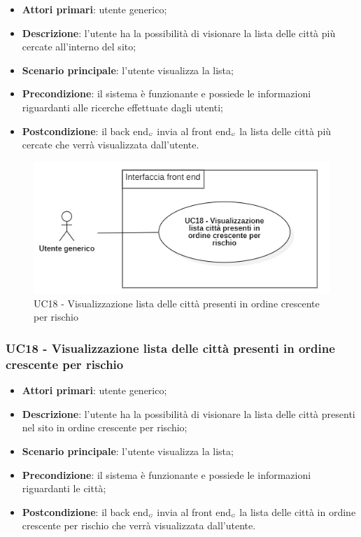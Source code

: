 \begin{itemize}
	\item \textbf{Attori primari}: utente generico;
	\item \textbf{Descrizione}: l'utente ha la possibilità di visionare la lista delle città più cercate all'interno del sito;
	\item \textbf{Scenario principale}: l'utente visualizza la lista;
	\item \textbf{Precondizione}: il sistema è funzionante e possiede le informazioni riguardanti alle ricerche effettuate dagli utenti;
	\item \textbf{Postcondizione}: il back end$_{\scaleto{G}{3pt}}$ invia al front end$_{\scaleto{G}{3pt}}$ la lista delle città più cercate che verrà visualizzata dall'utente.
\end{itemize}



\begin{center}
	\begin{figure}[H]
		\centering\includegraphics[scale=0.7]{../immagini/attori_casi/uc18.png}
		\caption{UC18 - Visualizzazione lista delle città presenti in ordine crescente per rischio}
	\end{figure}
\end{center}

\subsubsection{UC18 - Visualizzazione lista delle città presenti in ordine crescente per rischio}\label{CasiDUsoCasiDUsoFacoltativiTraUnUtenteEIlFrontEndElencoCasiDUsoUC18VisualizzazioneListaDelleCittaPresentiInOrdineCrescentePerRischio}


\begin{itemize}
	\item \textbf{Attori primari}: utente generico;
	\item \textbf{Descrizione}: l'utente ha la possibilità di visionare la lista delle città presenti nel sito in ordine crescente per rischio;
	\item \textbf{Scenario principale}: l'utente visualizza la lista;
	\item \textbf{Precondizione}:  il sistema è funzionante e possiede le informazioni riguardanti le città;
	\item \textbf{Postcondizione}: il back end$_{\scaleto{G}{3pt}}$ invia al front end$_{\scaleto{G}{3pt}}$ la lista delle città in ordine crescente per rischio che verrà visualizzata dall'utente.
\end{itemize}
